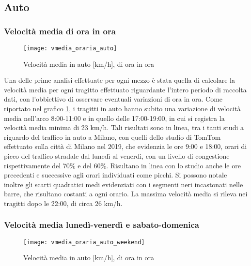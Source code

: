 \subsection{Auto}

\subsubsection{Velocità media di ora in ora}

\begin{figure}[H]
\texttt{[image: vmedia\_oraria\_auto]}
\caption{Velocità media in auto [km/h], di ora in ora}
\label{image:3}
\end{figure}

Una delle prime analisi effettuate per ogni mezzo è stata quella di calcolare la velocità media per ogni tragitto effettuato riguardante l'intero periodo di raccolta dati, con l'obbiettivo di osservare eventuali variazioni di ora in ora. Come riportato nel grafico \ref{image:3}, i tragitti in auto hanno subito una variazione di velocità media nell'arco 8:00-11:00 e in quello delle 17:00-19:00, in cui si registra la velocità media minima di 23 km/h. Tali risultati sono in linea, tra i tanti studi a riguardo del traffico in auto a Milano, con quelli dello studio di TomTom\cite{tomtomindexmilan} effettuato sulla città di Milano nel 2019, che evidenzia le ore 9:00 e 18:00, orari di picco del traffico stradale dal lunedì al venerdì, con un livello di congestione rispettivamente del 70\% e del 60\%. Risultano in linea con lo studio anche le ore precedenti e successive agli orari individuati come picchi. Si possono notale inoltre gli scarti quadratici medi evidenziati con i segmenti neri incastonati nelle barre, che risultano costanti a ogni orario. La massima velocità media si rileva nei tragitti dopo le 22:00, di circa 26 km/h.

\subsubsection{Velocità media lunedì-venerdì e sabato-domenica}

\begin{figure}[H]
\texttt{[image: vmedia\_oraria\_auto\_weekend]}
\caption{Velocità media in auto [km/h], di ora in ora}
\label{image:4}
\end{figure}

